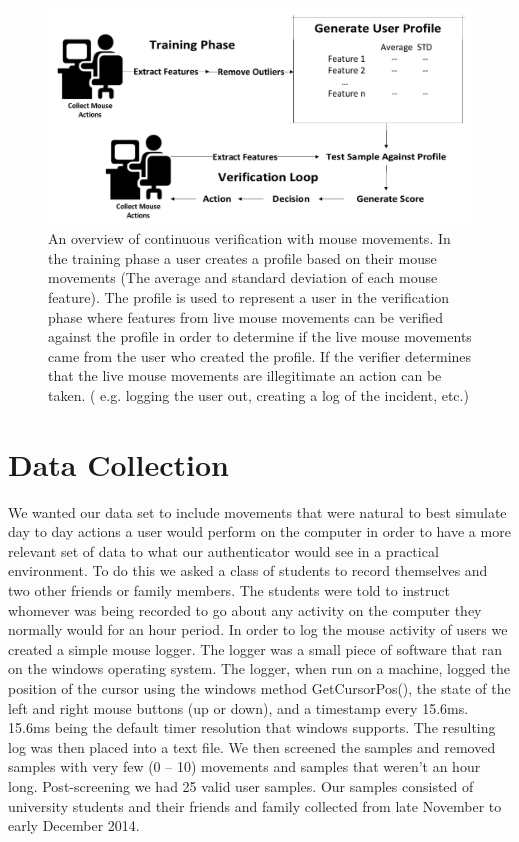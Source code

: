 \documentclass[conference]{IEEEtran}
\begin{document}
\begin{figure}[h!]
  \includegraphics[width=1\linewidth]{Overview.pdf}
\caption{An overview of continuous verification with mouse movements. In the training phase a user creates a profile based on their mouse movements (The average and standard deviation of each mouse feature). The profile is used to represent a user in the verification phase where features from live mouse movements can be verified against the profile in order to determine if the live mouse movements came from the user who created the profile. If the verifier determines that the live mouse movements are illegitimate an action can be taken. ( e.g. logging the user out, creating a log of the incident, etc.)}
\end{figure}




\section{Data Collection}
We wanted our data set to include movements that were natural to best simulate day to day actions a user would perform on the computer in order to have a more relevant set of data to what our authenticator would see in a practical environment. To do this we asked a class of students to record themselves and two other friends or family members. The students were told to instruct whomever was being recorded to go about any activity on the computer they normally would for an hour period.  
	In order to log the mouse activity of users we created a simple mouse logger.  The logger was a small piece of software that ran on the windows operating system. The logger, when run on a machine, logged the position of the cursor using the windows method GetCursorPos(), the state of the left and right mouse buttons (up or down), and a timestamp every 15.6ms. 15.6ms being the default timer resolution that windows supports. The resulting log was then placed into a text file. 
We then screened the samples and removed samples with very few (0 – 10) movements and samples that weren't an hour long. Post-screening we had 25 valid user samples.  Our samples consisted of university students and their friends and family collected from late November to early December 2014.
\end{document}
